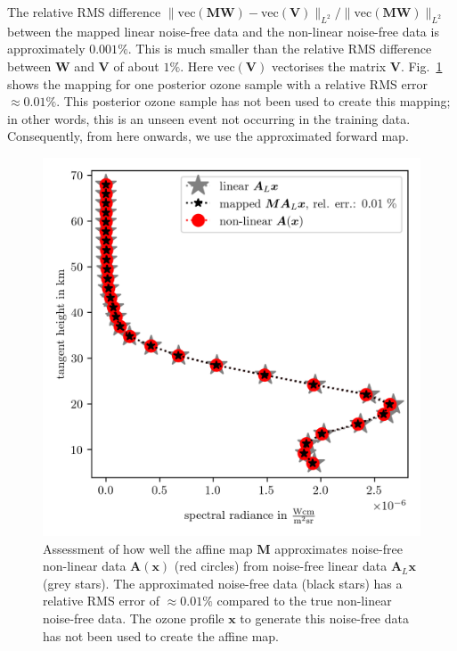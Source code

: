 The relative RMS difference $\lVert \text{vec}(\bm{M}\bm{W}) - \text{vec}(\bm{V})  \rVert_{L^2} / \lVert \text{vec}(\bm{M}\bm{W}) \rVert_{L^2} $ between the mapped linear noise-free data and the non-linear noise-free data is approximately $0.001\%$.
This is much smaller than the relative RMS difference between $\bm{W}$ and $\bm{V}$ of about $1\%$.
Here $\text{vec}(\bm{V})$ vectorises the matrix $\bm{V}$.
Fig.~\ref{fig:MapAsses} shows the mapping for one posterior ozone sample with a relative RMS error~$\approx0.01\%$.
This posterior ozone sample has not been used to create this mapping; in other words, this is an unseen event not occurring in the training data.
Consequently, from here onwards, we use the approximated forward map.
\begin{figure}[ht!]
	\centering
	\includegraphics{SampMapAssesmentTT.png}
	\caption[Assessment of affine map.]{Assessment of how well the affine map $\bm{M}$ approximates noise-free non-linear data $\bm{A}(\bm{x})$ (red circles) from noise-free linear data $\bm{A}_L\bm{x}$ (grey stars). The approximated noise-free data (black stars) has a relative RMS error of $\approx 0.01\%$ compared to the true non-linear noise-free data.
		The ozone profile $\bm{x}$ to generate this noise-free data has not been used to create the affine map.}
	\label{fig:MapAsses}
\end{figure}
\clearpage

